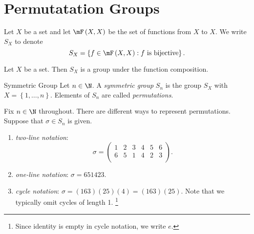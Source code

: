 \documentclass[pmath347]{subfiles}
\begin{document}
    \section{Permutatation Groups}

    \np Let $X$ be a set and let $\mF\left( X,X \right)$ be the set of functions from $X$ to $X$. We write $S_X$ to denote
    \begin{equation*}
        S_X = \left\lbrace f\in\mF\left( X,X \right) : f\text{ is bijective} \right\rbrace .
    \end{equation*}

    \begin{prop}{}
        Let $X$ be a set. Then $S_X$ is a group under the function composition.
    \end{prop}

    \begin{definition}{Symmetric Group}{}
        Let $n\in\N$. A \emph{symmetric group} $S_n$ is the group $S_X$ with $X=\left\lbrace 1,\ldots,n \right\rbrace$. Elements of $S_n$ are called \emph{permutations}.
    \end{definition}

    \np[Permutations]Fix $n\in\N$ throughout. There are different ways to represent permutations. Suppose that $\sigma\in S_n$ is given.
    \begin{enumerate}
        \item \textit{two-line notation}: 
            \begin{equation*}
                \sigma = 
                \begin{pmatrix}
                	1 & 2 & 3 & 4 & 5 & 6 \\
                	6 & 5 & 1 & 4 & 2 & 3 \\
                \end{pmatrix}.
            \end{equation*}
        \item \textit{one-line notation}: $\sigma=651423$.
        \item \textit{cycle notation}: $\sigma = \left( 163 \right) \left( 25 \right) \left( 4 \right) = \left( 163 \right) \left( 25 \right)$. Note that we typically omit cycles of length 1. \footnote{Since identity is empty in cycle notation, we write $e$.}
    \end{enumerate}
\end{document}
